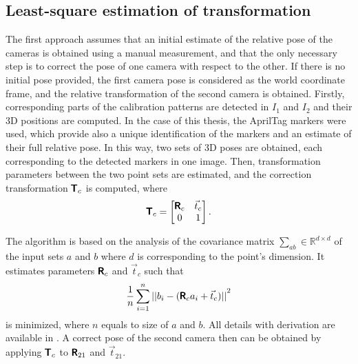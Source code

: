 \subsection{Least-square estimation of transformation}
\label{sec:lsq_umeyama}
The first approach assumes that an initial estimate of the relative pose of the cameras is obtained using a manual measurement, and that the only necessary step is to correct the pose of one camera with respect to the other.
If there is no initial pose provided, the first camera pose is considered as the world coordinate frame, and the relative transformation of the second camera is obtained. 
Firstly, corresponding parts of the calibration patterns are detected in $I_1$ and $I_2$ and their 3D positions are computed.
In the case of this thesis, the AprilTag markers \cite{Malyuta2019} were used, which provide also a unique identification of the markers and an estimate of their full relative pose.
In this way, two sets of 3D poses are obtained, each corresponding to the detected markers in one image.
Then, transformation parameters between the two point sets are estimated, and the correction transformation $\pmb{\mathsf{T}}_{c}$ is computed, where
\begin{equation}
    \pmb{\mathsf{T}}_{c} = 
    \begin{bmatrix}
        \pmb{\mathsf{R}}_c & \vec{t}_c \\ 
        0 & 1
    \end{bmatrix}.
\end{equation}

The algorithm is based on the analysis of the covariance matrix $\sum_{ab} \in \mathbb{R}^{d \times d}$ of the input sets $a$ and $b$ where $d$ is corresponding to the point's dimension. 
It estimates parameters $\pmb{\mathsf{R}}_c$ and $\vec{t}_c$ such that
\begin{equation}
    \frac{1}{n} \sum_{i=1}^{n}{|| b_i - (\pmb{\mathsf{R}}_c a_i + \vec{t}_c) ||}^2
\end{equation}
is minimized, where $n$ equals to size of $a$ and $b$.
All details with derivation are available in \cite{Umeyama1991}.
A correct pose of the second camera then can be obtained by applying $\pmb{\mathsf{T}}_{c}$ to $\pmb{\mathsf{R}}_{21}$ and $\vec{t}_{21}$.

